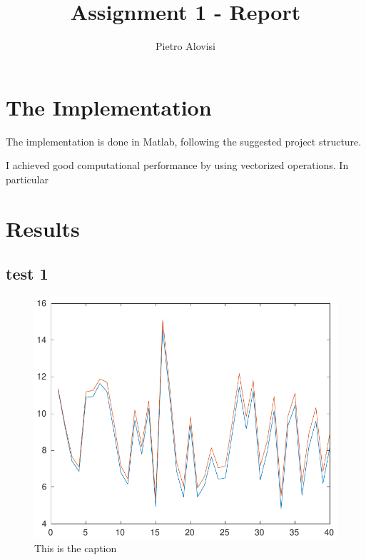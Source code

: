 \documentclass[]{article}
\title{Assignment 1 - Report}
\author{Pietro Alovisi}
\date{}
\begin{document}
\maketitle

\section{The Implementation}\label{the-implementation}

The implementation is done in Matlab, following the suggested project
structure.

I achieved good computational performance by using vectorized
operations. In particular

\section{Results}\label{results}

\subsection{test 1}\label{test-1}

\begin{figure}[h]
\centering
\includegraphics{../Result_Pics/b100e40eta1la0.pdf}
\caption{This is the caption}
\end{figure}
\end{document}
